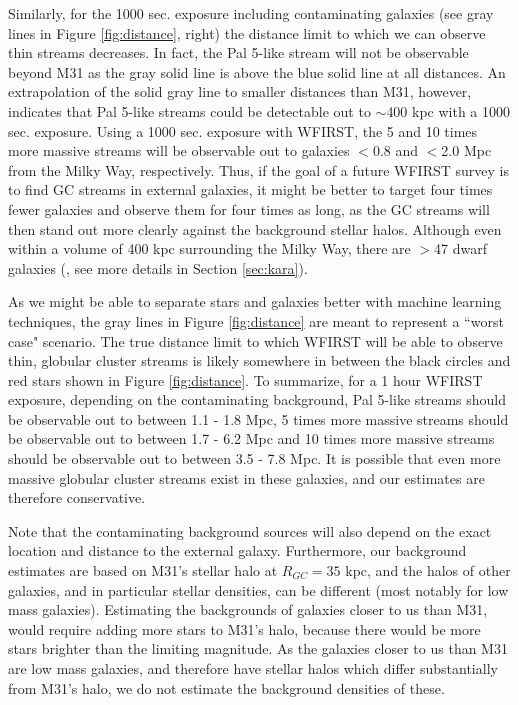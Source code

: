 \documentclass[twocolumn]{aastex62}
\begin{document}
Similarly, for the 1000 sec. exposure including contaminating galaxies (see gray lines in Figure \ref{fig:distance}, right) the distance limit to which we can observe thin streams decreases. In fact, the Pal 5-like stream will not be observable beyond M31 as the gray solid line is above the blue solid line at all distances. An extrapolation of the solid gray line to smaller distances than M31, however, indicates that Pal 5-like streams could be detectable out to $\sim$400 kpc with a 1000 sec. exposure. Using a 1000 sec. exposure with WFIRST, the 5 and 10 times more massive streams will be observable out to galaxies $<$0.8 and $<$2.0 Mpc from the Milky Way, respectively.  Thus, if the goal of a future WFIRST survey is to find GC streams in external galaxies, it might be better to target four times fewer galaxies and observe them for four times as long, as the GC streams will then stand out more clearly against the background stellar halos. Although even within a volume of 400 kpc surrounding the Milky Way, there are $>$47 dwarf galaxies (\citealt{kara19}, see more details in Section \ref{sec:kara}).
 
As we might be able to separate stars and galaxies better with machine learning techniques, the gray lines in Figure \ref{fig:distance} are meant to represent  a ``worst case" scenario. The true distance limit to which WFIRST will be able to observe thin, globular cluster streams is likely somewhere in between the black circles and red stars shown in Figure \ref{fig:distance}. To summarize, for a 1 hour WFIRST exposure, depending on the contaminating background, Pal 5-like streams should be observable out to between 1.1 - 1.8 Mpc, 5 times more massive streams should be observable out to between 1.7 - 6.2 Mpc and 10 times more massive streams should be observable out to between 3.5 - 7.8 Mpc. It is possible that even more massive globular cluster streams exist in these galaxies, and our estimates are therefore conservative.

Note that the contaminating background sources will also depend on the exact location and distance to the external galaxy. Furthermore, our background estimates are based on M31's stellar halo at $R_{GC} = 35$ kpc, and the halos of other galaxies, and in particular stellar densities, can be different (most notably for low mass galaxies). Estimating the backgrounds of galaxies closer to us than M31, would require adding more stars to M31's halo, because there would be more stars brighter than the limiting magnitude. As the galaxies closer to us than M31 are low mass galaxies, and therefore have stellar halos which differ substantially from M31's halo, we do not estimate the background densities of these. 
\end{document}
